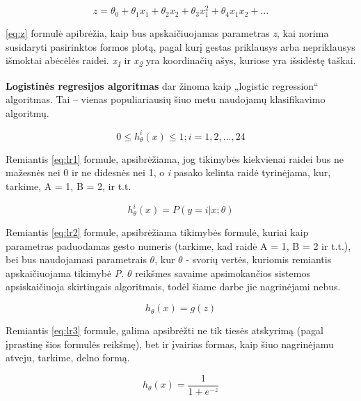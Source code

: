 \documentclass{VUMIFInfKursinis}
\begin{document}
\begin{equation}\label{eq:z}
	z = \theta_0+\theta_1x_1+\theta_2x_2+\theta_3x_1^2+\theta_4x_1x_2+...
\end{equation}

\ref{eq:z} formulė apibrėžia, kaip bus apskaičiuojamas parametras \textit{z}, kai norima susidaryti pasirinktos formos plotą, pagal kurį gestas priklausys arba nepriklausys išmoktai abėcėlės raidei. \textit{x\textsubscript{1}} ir \textit{x\textsubscript{2}} yra koordinačių ašys, kuriose yra išsidėstę taškai.


\textbf{Logistinės regresijos algoritmas} dar žinoma kaip „logistic regression“ algoritmas. Tai – vienas populiariausių šiuo metu naudojamų klasifikavimo algoritmų.

\begin{equation}\label{eq:lr1}
	0 \leq h_\theta^i(x) \leq 1; i = 1, 2, ..., 24
\end{equation}

Remiantis \ref{eq:lr1} formule, apsibrėžiama, jog tikimybės kiekvienai raidei bus ne mažesnės nei 0 ir ne didesnės nei 1, o \textit{i} pasako kelinta raidė tyrinėjama, kur, tarkime, A = 1, B = 2, ir t.t.


\begin{equation}\label{eq:lr2}
	h_\theta^i(x) = P(y=i | x; \theta)
\end{equation}

Remiantis \ref{eq:lr2} formule, apsibrėžiama tikimybės formulė, kuriai kaip parametras paduodamas gesto numeris (tarkime, kad raidė A = 1, B = 2 ir t.t.), bei bus naudojamasi parametrais $\theta$, kur  $\theta$ - svorių vertės, kuriomis remiantis apskaičiuojama tikimybė 
\textit{P}. $\theta$ reikšmes savaime apsimokančios sistemos apsiskaičiuoja skirtingais algoritmais, todėl šiame darbe jie nagrinėjami nebus.

\begin{equation}\label{eq:lr3}
	h_\theta(x)= g(z)
\end{equation}


Remiantis \ref{eq:lr3} formule, galima apsibrėžti ne tik tiesės atskyrimą (pagal įprastinę šios formulės reikšmę), bet ir įvairias formas, kaip šiuo nagrinėjamu atveju, tarkime, delno formą. 

\begin{equation}\label{eq:lr4}
	h_\theta(x) = \frac{1}{1+e^{-z}}
\end{equation}
\end{document}
